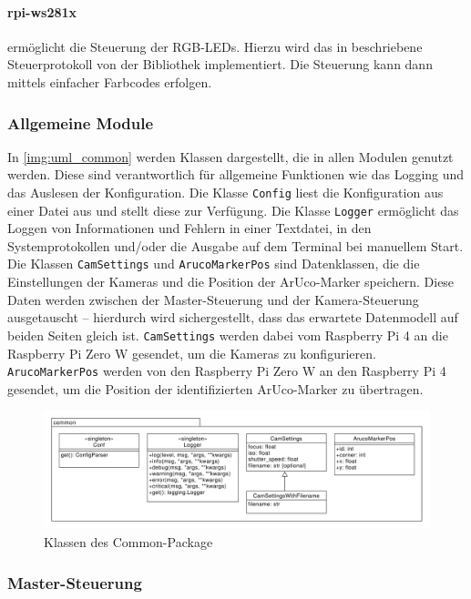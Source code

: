 \documentclass[./00PhotoBox.tex]{subfiles}
\begin{document}
\paragraph{rpi-ws281x}
\label{p:ws281x}
ermöglicht die Steuerung der RGB-LEDs. Hierzu wird das in \cite{ws2811} beschriebene Steuerprotokoll von der Bibliothek implementiert. Die Steuerung kann dann mittels einfacher Farbcodes erfolgen.

\subsubsection{Allgemeine Module}
In \autoref{img:uml_common} werden Klassen dargestellt, die in allen Modulen genutzt werden. Diese sind verantwortlich für allgemeine Funktionen wie das Logging und das Auslesen der Konfiguration. Die Klasse \texttt{Config} liest die Konfiguration aus einer Datei aus und stellt diese zur Verfügung. Die Klasse \texttt{Logger} ermöglicht das Loggen von Informationen und Fehlern in einer Textdatei, in den Systemprotokollen und/oder die Ausgabe auf dem Terminal bei manuellem Start. Die Klassen \texttt{CamSettings} und \texttt{ArucoMarkerPos} sind Datenklassen, die die Einstellungen der Kameras und die Position der ArUco-Marker speichern. Diese Daten werden zwischen der Master-Steuerung und der Kamera-Steuerung ausgetauscht -- hierdurch wird sichergestellt, dass das erwartete Datenmodell auf beiden Seiten gleich ist. \texttt{CamSettings} werden dabei vom Raspberry Pi 4 an die Raspberry Pi Zero W gesendet, um die Kameras zu konfigurieren. \texttt{ArucoMarkerPos} werden von den Raspberry Pi Zero W an den Raspberry Pi 4 gesendet, um die Position der identifizierten ArUco-Marker zu übertragen.

\begin{figure}
  \centering
  \includegraphics[width=1\textwidth]{./img/uml/uml_common_classdiagramm.pdf}
  \caption{Klassen des Common-Package} %
  \label{img:uml_common} %
\end{figure}


\subsubsection{Master-Steuerung}
\end{document}
